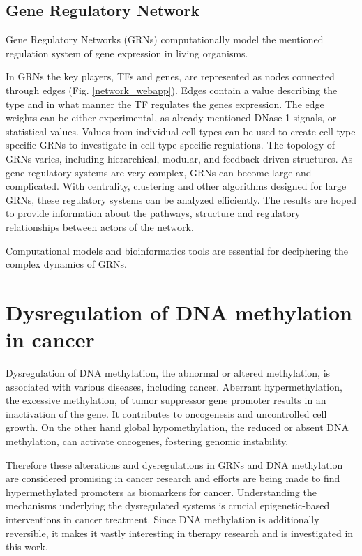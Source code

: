 \documentclass[pdftex,12pt,a4paper]{report}
\begin{document}
\subsection{Gene Regulatory Network}
Gene Regulatory Networks (GRNs) computationally model the mentioned regulation system of gene expression in living organisms\cite{GRN2}. 	

In GRNs the key players, TFs and genes, are represented as nodes connected through edges (Fig. \ref{network_webapp}). Edges contain a value describing the type and in what manner the TF regulates the genes expression. The edge weights can be either experimental, as already mentioned DNase 1 signals, or statistical values. Values from individual cell types can be used to create cell type specific GRNs to investigate in cell type specific regulations. 
The topology of GRNs varies, including hierarchical, modular, and feedback-driven structures. As gene regulatory systems are very complex, GRNs can become large and complicated. With centrality, clustering and other algorithms designed for large GRNs, these regulatory systems can be analyzed efficiently. The results are hoped to provide information about the pathways, structure and regulatory relationships between actors of the network\cite{GRN3}. 

Computational models and bioinformatics tools are essential for deciphering the complex dynamics of GRNs. 

\section{Dysregulation of DNA methylation in cancer}
Dysregulation of DNA methylation, the abnormal or altered methylation, is associated with various diseases, including cancer. Aberrant hypermethylation, the excessive methylation, of tumor suppressor gene promoter results in an inactivation of the gene. It contributes to oncogenesis and uncontrolled cell growth. On the other hand global hypomethylation, the reduced or absent DNA methylation, can activate oncogenes, fostering genomic instability\cite{MethCancer}.

Therefore these alterations and dysregulations in GRNs and DNA methylation are considered promising in cancer research and efforts are being made to find hypermethylated promoters as biomarkers for cancer. Understanding the mechanisms underlying the dysregulated systems is crucial epigenetic-based interventions in cancer treatment. Since DNA methylation is additionally reversible, it makes it vastly interesting in therapy research and is investigated in this work\cite{MethRole}.
\end{document}
